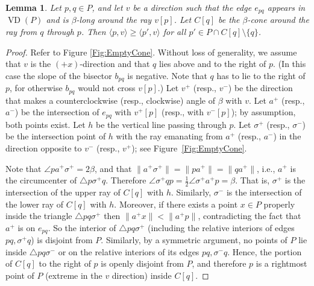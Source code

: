 \documentclass[letter,11pt]{article}
\newtheorem{lemma}[theorem]{Lemma}
\def\inprod#1#2{\langle #1, #2\rangle}
\def\bisect{b}
\def\VD{\mathop{\mathrm{VD}}}
\begin{document}
\begin{lemma}\label{Lemma:EmptyCone}
Let $p,q\in P$, and let $v$ be a direction such that the
edge $e_{pq}$ appears in $\VD(P)$ and is $\beta$-long around the ray 
$v[p]$. Let $C[q]$ be the $\beta$-cone around the ray from $q$ through 
$p$.  Then $\inprod{p}{v}\geq \inprod{p'}{v}$ for all
$p'\in P\cap C[q]\setminus \{q \}$.
\end{lemma}
\begin{proof}
Refer to Figure \ref{Fig:EmptyCone}. Without loss of generality, we assume that $v$ is the $(+x)$-direction
and that $q$ lies above and to the right of $p$. (In this case the slope of the bisector $\bisect_{pq}$ is negative. Note that $q$ has to
lie to the right of $p$, for otherwise $\bisect_{pq}$ would not cross $v[p]$.) 
Let $v^+$
(resp., $v^-$) be the direction that makes a counterclockwise (resp.,
clockwise) angle of $\beta$ with $v$. Let $a^+$ (resp., $a^-$) be
the intersection  of $e_{pq}$ with $v^+[p]$ (resp., with $v^-[p]$); by assumption, both points exist.
Let $h$ be the vertical line passing through $p$. Let $\sigma^+$
(resp., $\sigma^-$) be the intersection point of $h$ with the ray
emanating from $a^+$ (resp., $a^-$) in the direction opposite to
$v^-$ (resp., $v^+$); see Figure~\ref{Fig:EmptyCone}.

Note that $\angle pa^+\sigma^+=2\beta$, and  that
$\|a^+\sigma^+\|=\|pa^+\|=\|qa^+\|$, i.e., $a^+$ is the circumcenter
of $\triangle p\sigma^+q$.   Therefore $\angle \sigma^+ q p =
\frac12{\angle \sigma^+ a^+p} = \beta$. That is, $\sigma^+$ is the intersection of the upper ray of $C[q]$ with $h$.
Similarly, $\sigma^-$ is the intersection of the lower ray of $C[q]$ with $h$.
Moreover, if there exists a
 point $x\in P$ properly inside the triangle $\triangle pq\sigma^+$
then
$\|a^+x\| < \|a^+p\|$,
contradicting the fact that $a^+$ is on $e_{pq}$. So the interior of $\triangle pq\sigma^+$ (including the relative interiors of edges $pq,\sigma^+q$) is disjoint from $P$.
 Similarly, by a symmetric argument, no points of $P$ lie inside 
$\triangle pq\sigma^-$ or on the relative interiors of its edges $pq,\sigma^-q$.
Hence, the portion of $C[q]$ to the right of $p$ is openly disjoint from $P$, and therefore $p$ is a rightmost point of $P$ (extreme in the $v$ direction) inside $C[q]$.\end{proof}
\end{document}
